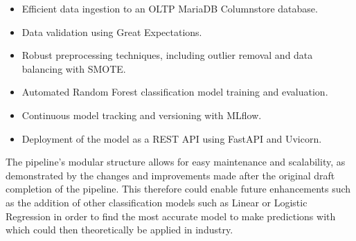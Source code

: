 \documentclass[12pt]{report}
\begin{document}
\begin{itemize}
    \item Efficient data ingestion to an OLTP MariaDB Columnstore database.
    \item Data validation using Great Expectations.
    \item Robust preprocessing techniques, including outlier removal and data balancing with SMOTE.
    \item Automated Random Forest classification model training and evaluation.
    \item Continuous model tracking and versioning with MLflow.
    \item Deployment of the model as a REST API using FastAPI and Uvicorn.
\end{itemize}

\noindent The pipeline's modular structure allows for easy maintenance and scalability, as demonstrated by the changes and improvements 
made after the original draft completion of the pipeline. This therefore could enable future enhancements such as the addition 
of other classification models such as Linear or Logistic Regression in order to find the most accurate model to make predictions with 
which could then theoretically be applied in industry.
   



% 








\printbibliography
\end{document}
